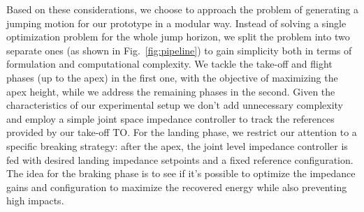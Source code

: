 Based on these considerations, we choose to approach the problem of generating a jumping motion for our prototype in a modular way. Instead of solving a single optimization problem for the whole jump horizon, we split the problem into two separate ones (as shown in Fig.~\ref{fig:pipeline}) to gain simplicity both in terms of formulation and computational complexity. We tackle the take-off and flight phases (up to the apex) in the first one, with the objective of maximizing the apex height, while we address the remaining phases in the second. Given the characteristics of our experimental setup we don't add unnecessary complexity and employ a simple joint space impedance controller to track the references provided by our take-off TO. For the landing phase, we restrict our attention to a specific breaking strategy: after the apex, the joint level impedance controller is fed with desired landing impedance setpoints and a fixed reference configuration. The idea for the braking phase is to see if it's possible to optimize the impedance gains and configuration to maximize the recovered energy while also preventing high impacts.

